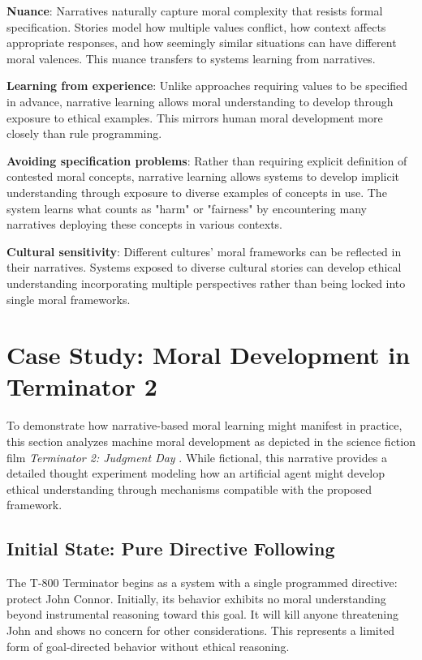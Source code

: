 \documentclass[12pt]{article}
\begin{document}
\textbf{Nuance}: Narratives naturally capture moral complexity that resists formal specification. Stories model how multiple values conflict, how context affects appropriate responses, and how seemingly similar situations can have different moral valences. This nuance transfers to systems learning from narratives.

\textbf{Learning from experience}: Unlike approaches requiring values to be specified in advance, narrative learning allows moral understanding to develop through exposure to ethical examples. This mirrors human moral development more closely than rule programming.

\textbf{Avoiding specification problems}: Rather than requiring explicit definition of contested moral concepts, narrative learning allows systems to develop implicit understanding through exposure to diverse examples of concepts in use. The system learns what counts as "harm" or "fairness" by encountering many narratives deploying these concepts in various contexts.

\textbf{Cultural sensitivity}: Different cultures' moral frameworks can be reflected in their narratives. Systems exposed to diverse cultural stories can develop ethical understanding incorporating multiple perspectives rather than being locked into single moral frameworks.

\section{Case Study: Moral Development in Terminator 2}

To demonstrate how narrative-based moral learning might manifest in practice, this section analyzes machine moral development as depicted in the science fiction film \textit{Terminator 2: Judgment Day} \citep{cameron1991terminator}. While fictional, this narrative provides a detailed thought experiment modeling how an artificial agent might develop ethical understanding through mechanisms compatible with the proposed framework.

\subsection{Initial State: Pure Directive Following}

The T-800 Terminator begins as a system with a single programmed directive: protect John Connor. Initially, its behavior exhibits no moral understanding beyond instrumental reasoning toward this goal. It will kill anyone threatening John and shows no concern for other considerations. This represents a limited form of goal-directed behavior without ethical reasoning.
\end{document}
